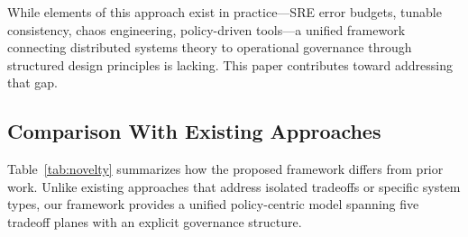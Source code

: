 \documentclass[conference]{IEEEtran}
\begin{document}
While elements of this approach exist in practice---SRE error budgets, tunable consistency, chaos engineering, policy-driven tools---a unified framework connecting distributed systems theory to operational governance through structured design principles is lacking. This paper contributes toward addressing that gap.

\subsection{Comparison With Existing Approaches}

Table~\ref{tab:novelty} summarizes how the proposed framework differs from prior work. Unlike existing approaches that address isolated tradeoffs or specific system types, our framework provides a unified policy-centric model spanning five tradeoff planes with an explicit governance structure.
\end{document}
